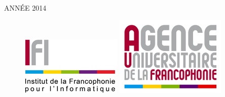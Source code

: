 \begin{titlepage}

\begin{flushright}
ANNÉE 2014\\[1.0cm]
\end{flushright}
\begin{center}
\begin{figure}[!htb]
  \includegraphics[width=\linewidth]{images/ifi-logo}
\endminipage\hfill
{}
  \includegraphics[width=\linewidth]{images/auf-logo}
\endminipage\hfill
{}

\end{figure}
\end{center}
\end{titlepage}
